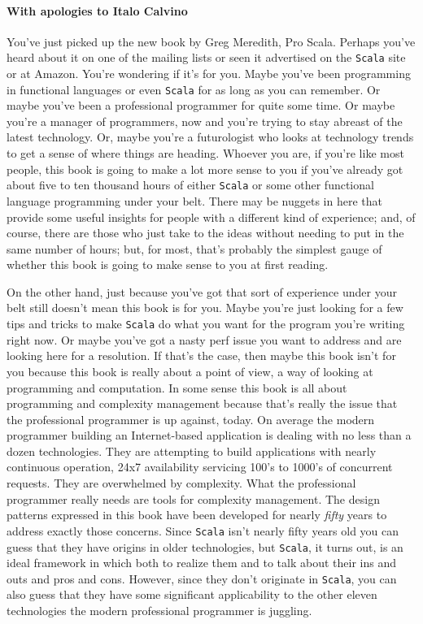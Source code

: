 \paragraph{With apologies to Italo Calvino} You've just picked up the
new book by Greg Meredith, Pro Scala. Perhaps you've heard about it on
one of the mailing lists or seen it advertised on the \texttt{Scala}
site or at Amazon. You're wondering if it's for you. Maybe you've been
programming in functional languages or even \texttt{Scala} for as long
as you can remember. Or maybe you've been a professional programmer
for quite some time. Or maybe you're a manager of programmers, now and
you're trying to stay abreast of the latest technology. Or, maybe
you're a futurologist who looks at technology trends to get a sense of
where things are heading. Whoever you are, if you're like most people,
this book is going to make a lot more sense to you if you've already
got about five to ten thousand hours of either \texttt{Scala} or some
other functional language programming under your belt. There may be
nuggets in here that provide some useful insights for people with a
different kind of experience; and, of course, there are those who just
take to the ideas without needing to put in the same number of hours;
but, for most, that's probably the simplest gauge of whether this book
is going to make sense to you at first reading.

On the other hand, just because you've got that sort of experience
under your belt still doesn't mean this book is for you. Maybe you're
just looking for a few tips and tricks to make \texttt{Scala} do what
you want for the program you're writing right now. Or maybe you've got
a nasty perf issue you want to address and are looking here for a
resolution. If that's the case, then maybe this book isn't for you
because this book is really about a point of view, a way of looking at
programming and computation. In some sense this book is all about
programming and complexity management because that's really the issue
that the professional programmer is up against, today. On average the
modern programmer building an Internet-based application is dealing
with no less than a dozen technologies. They are attempting to build
applications with nearly continuous operation, 24x7 availability
servicing 100's to 1000's of concurrent requests. They are overwhelmed
by complexity. What the professional programmer really needs are tools
for complexity management. The design patterns expressed in this book
have been developed for nearly \emph{fifty} years to address exactly
those concerns. Since \texttt{Scala} isn't nearly fifty years old you
can guess that they have origins in older technologies, but
\texttt{Scala}, it turns out, is an ideal framework in which both to
realize them and to talk about their ins and outs and pros and
cons. However, since they don't originate in \texttt{Scala}, you can
also guess that they have some significant applicability to the other
eleven technologies the modern professional programmer is juggling.